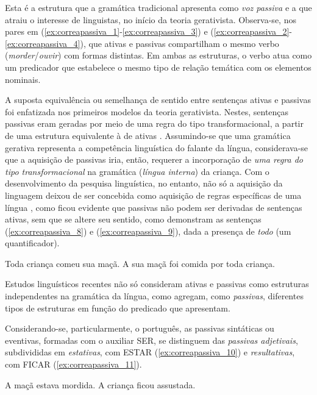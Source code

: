 \documentclass[output=paper]{LSP/langsci}
\begin{document}
Esta é a estrutura que a gramática tradicional apresenta como \textit{voz passiva} e a que atraiu o interesse de linguistas, no início da teoria gerativista. Observa-se, nos pares em (\ref{ex:correapassiva_1}-\ref{ex:correapassiva_3}) e (\ref{ex:correapassiva_2}-\ref{ex:correapassiva_4}), que ativas e passivas compartilham o mesmo verbo (\textit{morder}/\textit{ouvir}) com formas distintas. Em ambas as estruturas, o verbo atua como um predicador que estabelece o mesmo tipo de relação temática com os elementos nominais.

A suposta equivalência ou semelhança de sentido entre sentenças ativas e passivas foi enfatizada nos primeiros modelos da teoria gerativista. Nestes, sentenças passivas eram geradas por meio de uma regra do tipo transformacional, a partir de uma estrutura equivalente à de ativas \citep{chomsky1957,chomsky1965}. Assumindo-se que uma gramática gerativa representa a competência linguística do falante da língua, considerava-se que a aquisição de passivas iria, então, requerer a incorporação de \textit{uma regra do tipo transformacional} na gramática (\textit{língua interna}) da criança. Com o desenvolvimento da pesquisa linguística, no entanto, não só a aquisição da linguagem deixou de ser concebida como aquisição de regras específicas de uma língua \citep{chomsky1981}, como ficou evidente que passivas não podem ser derivadas de sentenças ativas, sem que se altere seu sentido, como demonstram as sentenças (\ref{ex:correapassiva_8}) e (\ref{ex:correapassiva_9}), dada a presença de \textit{todo} (um quantificador). 

\ea\label{ex:correapassiva_8} Toda criança comeu sua maçã.
\z
\ea\label{ex:correapassiva_9} A sua maçã foi comida por toda criança.
\z

Estudos linguísticos recentes não só consideram ativas e passivas como estruturas independentes na gramática da língua, como agregam, como \textit{passivas}, diferentes tipos de estruturas em função do predicado que apresentam. 

Considerando-se, particularmente, o português, as passivas sintáticas ou eventivas, formadas com o auxiliar SER, se distinguem das \textit{passivas adjetivais}, subdivididas em \textit{estativas}, com ESTAR (\ref{ex:correapassiva_10}) e \textit{resultativas}, com FICAR (\ref{ex:correapassiva_11}).

\ea\label{ex:correapassiva_10} A maçã estava mordida.
\z
\ea\label{ex:correapassiva_11} A criança ficou assustada.
\z
\end{document}
